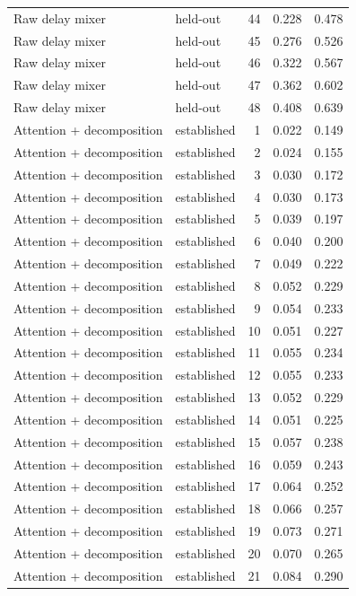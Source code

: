 \begin{tabular}{llrrr}
Raw delay mixer & held-out & 44 & 0.228 & 0.478 \\
Raw delay mixer & held-out & 45 & 0.276 & 0.526 \\
Raw delay mixer & held-out & 46 & 0.322 & 0.567 \\
Raw delay mixer & held-out & 47 & 0.362 & 0.602 \\
Raw delay mixer & held-out & 48 & 0.408 & 0.639 \\
Attention + decomposition & established & 1 & 0.022 & 0.149 \\
Attention + decomposition & established & 2 & 0.024 & 0.155 \\
Attention + decomposition & established & 3 & 0.030 & 0.172 \\
Attention + decomposition & established & 4 & 0.030 & 0.173 \\
Attention + decomposition & established & 5 & 0.039 & 0.197 \\
Attention + decomposition & established & 6 & 0.040 & 0.200 \\
Attention + decomposition & established & 7 & 0.049 & 0.222 \\
Attention + decomposition & established & 8 & 0.052 & 0.229 \\
Attention + decomposition & established & 9 & 0.054 & 0.233 \\
Attention + decomposition & established & 10 & 0.051 & 0.227 \\
Attention + decomposition & established & 11 & 0.055 & 0.234 \\
Attention + decomposition & established & 12 & 0.055 & 0.233 \\
Attention + decomposition & established & 13 & 0.052 & 0.229 \\
Attention + decomposition & established & 14 & 0.051 & 0.225 \\
Attention + decomposition & established & 15 & 0.057 & 0.238 \\
Attention + decomposition & established & 16 & 0.059 & 0.243 \\
Attention + decomposition & established & 17 & 0.064 & 0.252 \\
Attention + decomposition & established & 18 & 0.066 & 0.257 \\
Attention + decomposition & established & 19 & 0.073 & 0.271 \\
Attention + decomposition & established & 20 & 0.070 & 0.265 \\
Attention + decomposition & established & 21 & 0.084 & 0.290 \\

\end{tabular}
